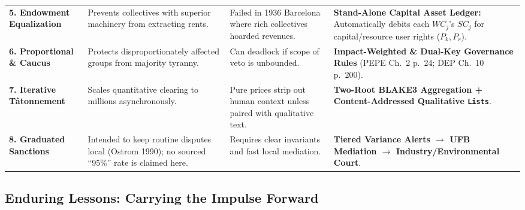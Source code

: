 \documentclass[10pt,twoside,openany]{book}
\theoremstyle{dpepstyle}
\begin{document}
\begin{table}[ht!]
\begin{tabularx}{\textwidth}{L{1.12in} L{1.02in} L{1.02in} Y}
\addlinespace[4pt]
\textbf{5. Endowment Equalization} & Prevents collectives with superior machinery from extracting rents. & Failed in 1936 Barcelona where rich collectives hoarded revenues. & \textbf{Stand-Alone Capital Asset Ledger:} Automatically debits each $WC_j$'s $SC_j$ for capital/resource user rights ($P_k, P_r$). \\
\addlinespace[4pt]
\textbf{6. Proportional \& Caucus} & Protects disproportionately affected groups from majority tyranny. & Can deadlock if scope of veto is unbounded. & \textbf{Impact-Weighted \& Dual-Key Governance Rules} (PEPE Ch.~2 p.~24; DEP Ch.~10 p.~200). \\
\addlinespace[4pt]
\textbf{7. Iterative T\^atonnement} & Scales quantitative clearing to millions asynchronously. & Pure prices strip out human context unless paired with qualitative text. & \textbf{Two-Root BLAKE3 Aggregation + Content-Addressed Qualitative \texttt{Lists}}. \\
\addlinespace[4pt]
\textbf{8. Graduated Sanctions} & Intended to keep routine disputes local (Ostrom 1990); no sourced ``95\%'' rate is claimed here. & Requires clear invariants and fast local mediation. & \textbf{Tiered Variance Alerts $\to$ UFB Mediation $\to$ Industry/Environmental Court}. \\
\bottomrule
\end{tabularx}
\end{table}

\FloatBarrier
\subsection{Enduring Lessons: Carrying the Impulse Forward}
\label{sec:enduring}
\end{document}
